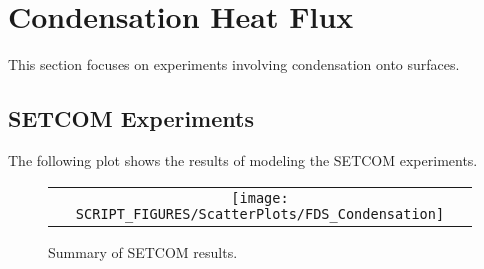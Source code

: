 \clearpage

\section{Condensation Heat Flux}
\label{Condensation}
This section focuses on experiments involving condensation onto surfaces.

\subsection{SETCOM Experiments}
The following plot shows the results of modeling the SETCOM experiments.

\begin{figure}[h!]
        \begin{center}
                \begin{tabular}{c}
                        \texttt{[image: SCRIPT\_FIGURES/ScatterPlots/FDS\_Condensation]}
                \end{tabular}
        \end{center}
        \caption[Summary of SETCOM results]{Summary of SETCOM results.}
        \label{SETCOM_summary}
\end{figure}

